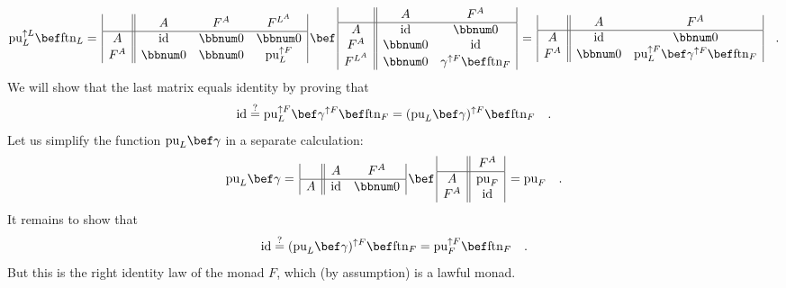 \[
\text{pu}_{L}^{\uparrow L}\bef\text{ftn}_{L}=\,\begin{array}{|c||ccc|}
 & A & F^{A} & F^{L^{A}}\\
\hline A & \text{id} & \bbnum 0 & \bbnum 0\\
F^{A} & \bbnum 0 & \bbnum 0 & \text{pu}_{L}^{\uparrow F}
\end{array}\,\bef\,\begin{array}{|c||cc|}
 & A & F^{A}\\
\hline A & \text{id} & \bbnum 0\\
F^{A} & \bbnum 0 & \text{id}\\
F^{L^{A}} & \bbnum 0 & \gamma^{\uparrow F}\bef\text{ftn}_{F}
\end{array}\,=\,\begin{array}{|c||cc|}
 & A & F^{A}\\
\hline A & \text{id} & \bbnum 0\\
F^{A} & \bbnum 0 & \text{pu}_{L}^{\uparrow F}\bef\gamma^{\uparrow F}\bef\text{ftn}_{F}
\end{array}\quad.
\]
We will show that the last matrix equals identity by proving that
\[
\text{id}\overset{?}{=}\text{pu}_{L}^{\uparrow F}\bef\gamma^{\uparrow F}\bef\text{ftn}_{F}=(\text{pu}_{L}\bef\gamma)^{\uparrow F}\bef\text{ftn}_{F}\quad.
\]
Let us simplify the function $\text{pu}_{L}\bef\gamma$ in a separate
calculation:
\[
\text{pu}_{L}\bef\gamma=\,\begin{array}{|c||cc|}
 & A & F^{A}\\
\hline A & \text{id} & \bbnum 0
\end{array}\,\bef\,\begin{array}{|c||c|}
 & F^{A}\\
\hline A & \text{pu}_{F}\\
F^{A} & \text{id}
\end{array}\,=\text{pu}_{F}\quad.
\]
It remains to show that
\[
\text{id}\overset{?}{=}(\text{pu}_{L}\bef\gamma)^{\uparrow F}\bef\text{ftn}_{F}=\text{pu}_{F}^{\uparrow F}\bef\text{ftn}_{F}\quad.
\]
But this is the right identity law of the monad $F$, which (by assumption)
is a lawful monad. 

